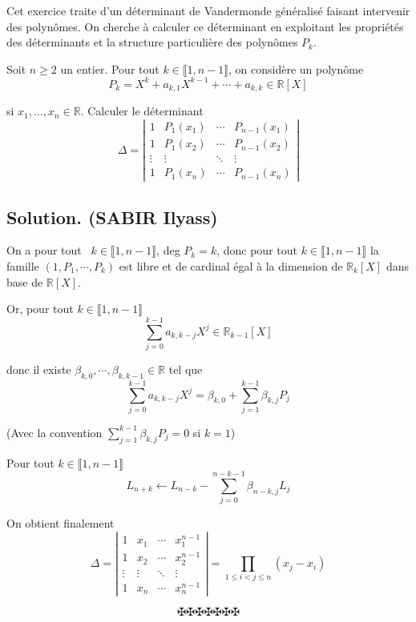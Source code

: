 Cet exercice traite d'un d{\'e}terminant de Vandermonde g{\'e}n{\'e}ralis{\'e}
faisant intervenir des polyn{\^o}mes. On cherche {\`a} calculer ce
d{\'e}terminant en exploitant les propri{\'e}t{\'e}s des d{\'e}terminants et
la structure particuli{\`e}re des polyn{\^o}mes $P_k $.

\begin{exercise}
Soit $n \geq 2$ un entier. Pour tout $k \in \llbracket 1, n - 1 \rrbracket$,
on consid{\`e}re un polyn{\^o}me
\[ P_k = X^k + a_{k, 1} X^{k - 1} + \cdots + a_{k, k} \in \mathbb{R}[X] \]


si $x_1, \ldots, x_n \in \mathbb{R}$. Calculer le d{\'e}terminant
\[ \Delta = \left|\begin{array}{cccc}
     1 & P_1 (x_1) & \cdots & P_{n - 1} (x_1)\\
     1 & P_1 (x_2) & \cdots & P_{n - 1} (x_2)\\
     \vdots & \vdots & \ddots & \vdots\\
     1 & P_1 (x_n) & \cdots & P_{n - 1} (x_n)
   \end{array}\right| \]

\end{exercise}

\subsection*{Solution. (SABIR Ilyass)}

On a pour tout \ $k \in \llbracket 1, n - 1 \rrbracket$, deg $P_k = k$, donc
pour tout $k \in \llbracket 1, n - 1 \rrbracket$ la famille $(1, P_1, \cdots,
P_k)$ est libre et de cardinal {\'e}gal {\`a} la dimension de $\mathbb{R}_k
[X]$ dans base de $\mathbb{R}[X]$.

Or, pour tout $k \in \llbracket 1, n - 1 \rrbracket$
\[ \sum_{j = 0}^{k - 1} a_{k, k - j} X^j \in \mathbb{R}_{k - 1} [X] \]


donc il existe $\beta_{k, 0}, \cdots, \beta_{k, k - 1} \in \mathbb{R}$ tel que
\[ \sum_{j = 0}^{k - 1} a_{k, k - j} X^j = \beta_{k, 0} + \sum_{j = 1}^{k - 1}
   \beta_{k, j} P_j \]


(Avec la convention $\sum_{j = 1}^{k - 1} \beta_{k, j} P_j = 0$ si $k = 1$)

Pour tout $k \in \llbracket 1, n - 1 \rrbracket$
\[ L_{n + k} \leftarrow L_{n - k} - \sum_{j = 0}^{n - k - 1} \beta_{n - k, j}
   L_j \]


On obtient finalement
\[ \Delta = \left|\begin{array}{cccc}
     1 & x_1 & \cdots & x_1^{n - 1}\\
     1 & x_2 & \cdots & x_2^{n - 1}\\
     \vdots & \vdots & \ddots & \vdots\\
     1 & x_n & \cdots & x_n^{n - 1}
   \end{array}\right| = \prod_{1 \leq i < j \leq n} (x_j - x_i) \]

\[ \maltese \maltese \maltese \maltese \maltese \maltese \maltese \]
